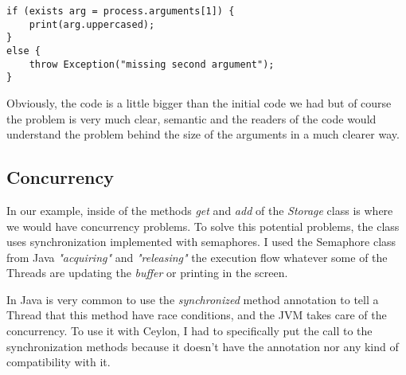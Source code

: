 \begin{lstlisting}[label=cpc,caption=Ceylon Producer-Consumer example]
if (exists arg = process.arguments[1]) {
    print(arg.uppercased);
}
else {
    throw Exception("missing second argument");
}
\end{lstlisting}

Obviously, the code is a little bigger than the initial code we had but of
course the problem is very much clear, semantic and the readers of the code
would understand the problem behind the size of the arguments in a much clearer
way.

\subsection{Concurrency}

In our example, inside of the methods \textit{get} and \textit{add} of the \textit{Storage} class is
where we would have concurrency problems\cite{2_1}. To solve this potential
problems, the class uses synchronization implemented with semaphores. I used the
Semaphore class from Java \textit{"acquiring"} and \textit{"releasing"} the
execution flow whatever some of the Threads are updating the \textit{buffer} or
printing in the screen.

In Java is very common to use the \textit{synchronized} method annotation to tell a
Thread that this method have race conditions, and the JVM takes care of the
concurrency. To use it with Ceylon, I had to specifically put the call to the
synchronization methods because it doesn't have the annotation nor any kind of
compatibility with it.